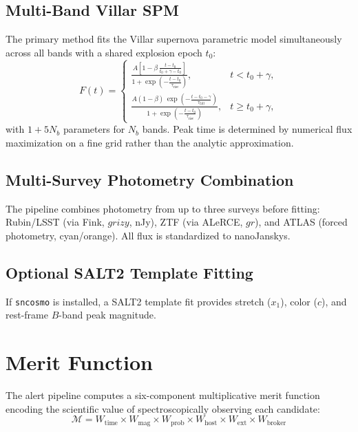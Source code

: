\documentclass[11pt,letterpaper]{article}
\begin{document}
\subsection{Multi-Band Villar SPM}
\label{sec:villar}

The primary method fits the Villar supernova parametric model
\citep{Villar2019} simultaneously across all bands with a shared
explosion epoch $t_0$:
\begin{equation}
F(t) =
\begin{cases}
\displaystyle
\frac{A\!\left[1 - \beta\,\frac{t - t_0}{t_0 + \gamma - t_0}\right]}
{1 + \exp\!\left(-\frac{t - t_0}{\tau_{\mathrm{rise}}}\right)},
& t < t_0 + \gamma, \\[12pt]
\displaystyle
\frac{A(1-\beta)\,\exp\!\left(-\frac{t - t_0 - \gamma}{\tau_{\mathrm{fall}}}\right)}
{1 + \exp\!\left(-\frac{t - t_0}{\tau_{\mathrm{rise}}}\right)},
& t \geq t_0 + \gamma,
\end{cases}
\end{equation}
with $1 + 5N_b$ parameters for $N_b$ bands.  Peak time is determined
by numerical flux maximization on a fine grid rather than the analytic
approximation.

\subsection{Multi-Survey Photometry Combination}

The pipeline combines photometry from up to three surveys before
fitting: Rubin/LSST (via Fink, $grizy$, nJy), ZTF (via ALeRCE,
$gr$), and ATLAS (forced photometry, cyan/orange).  All flux is
standardized to nanoJanskys.

\subsection{Optional SALT2 Template Fitting}

If \texttt{sncosmo} is installed, a SALT2 template fit provides
stretch ($x_1$), color ($c$), and rest-frame $B$-band peak magnitude.


\section{Merit Function}
\label{sec:merit}

The alert pipeline computes a six-component multiplicative merit
function encoding the scientific value of spectroscopically observing
each candidate:
\begin{equation}
\label{eq:merit}
\boxed{\mathcal{M} = W_{\mathrm{time}} \times W_{\mathrm{mag}}
\times W_{\mathrm{prob}} \times W_{\mathrm{host}} \times
W_{\mathrm{ext}} \times W_{\mathrm{broker}}}
\end{equation}
\end{document}
